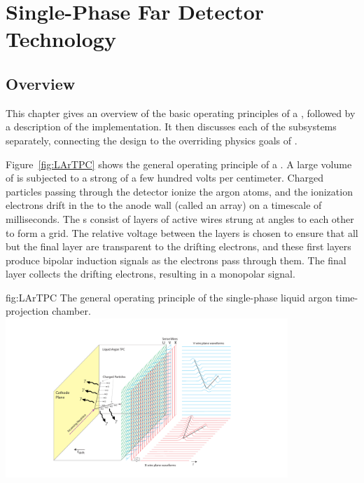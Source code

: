 \chapter{Single-Phase Far Detector Technology}
\label{ch:exec-sp}

\section{Overview}
\label{sec:exec-sp-over}

This chapter gives an overview of the basic operating principles of a  , followed by a description of the  implementation. It then discusses each of the subsystems separately, connecting the design to the overriding physics goals of .

Figure~\ref{fig:LArTPC} shows the general operating principle of a  . A large volume of  is subjected to a strong \efield of a few hundred volts per centimeter. Charged particles passing through the detector ionize the argon atoms, and the ionization electrons drift in the \efield to the anode wall (called an  array) on a timescale of milliseconds. The  s consist of layers of active wires strung at angles to each other to form a grid. The relative voltage between the layers is chosen to ensure that all but the final layer are transparent to the drifting electrons, and these first layers produce bipolar induction signals as the electrons pass through them. The final layer collects the drifting electrons, resulting in a monopolar signal.

\begin{dunefigure}{fig:LArTPC}
{The general operating principle of the single-phase liquid argon time-projection chamber.}
\includegraphics[trim={5cm 0 5cm 0},clip,width=0.8\textwidth]{graphics/TheBoPicture.pdf}
\end{dunefigure}


